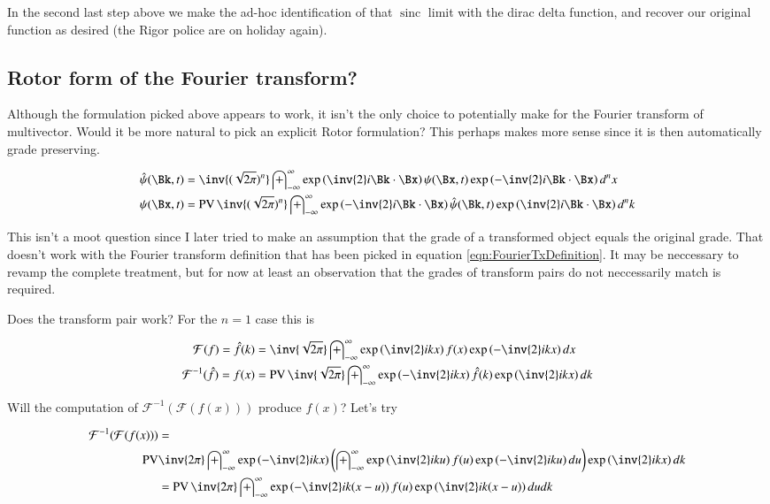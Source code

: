 \documentclass{article}
\DeclareMathOperator{\sinc}{sinc}
\DeclareMathOperator{\PV}{PV}
\newcommand{\FF}[0]{\mathcal{F}}
\newcommand{\IIinf}[0]{ \int_{-\infty}^\infty }
\begin{document}
In the second last step above we make the ad-hoc identification of that $\sinc$ limit with the dirac delta function, and recover
our original function as desired (the Rigor police are on holiday again).

\subsection{ Rotor form of the Fourier transform? }

Although the formulation picked above appears to work, it isn't the only choice to potentially make for the Fourier transform
of multivector.  Would it be more natural to pick an explicit Rotor formulation?  This perhaps makes more sense since it is then
automatically grade preserving.

\begin{align}\label{eqn:rotorFourier}
\hat{\psi}(\Bk, t) &= \inv{(\sqrt{2\pi})^n} \IIinf \exp\left( \inv{2} i \Bk \cdot \Bx \right) \psi(\Bx, t) \exp\left( - \inv{2} i \Bk \cdot \Bx \right) d^n x \\
{\psi}(\Bx, t) &= \PV \inv{(\sqrt{2\pi})^n} \IIinf \exp\left( -\inv{2} i \Bk \cdot \Bx \right) \hat{\psi}(\Bk, t) \exp\left( \inv{2} i \Bk \cdot \Bx \right) d^n k
\end{align}

This isn't a moot question since I later
tried to make an assumption that the grade of a transformed object equals the original grade.  That doesn't work with the
Fourier transform definition that has been picked in equation \ref{eqn:FourierTxDefinition}.  It may be neccessary to revamp the complete treatment, but
for now at least an observation that the grades of transform pairs do not neccessarily match is required.

Does the transform pair work?  For the $n=1$ case this is

\begin{align*}
\FF(f) = \hat{f}(k) &= \inv{\sqrt{2\pi}} \IIinf \exp\left( \inv{2} i k x \right) f(x) \exp\left( - \inv{2} i k x \right) dx \\
\FF^{-1}(\hat{f}) = {f}(x) &= \PV \inv{\sqrt{2\pi}} \IIinf \exp\left( -\inv{2} i k x \right) \hat{f}(k) \exp\left( \inv{2} i k x \right) dk
\end{align*}

Will the computation of $\FF^{-1}(\FF(f(x)))$ produce $f(x)$?  Let's try

\begin{align*}
\FF^{-1}(\FF(f(x)))
&= \\
\PV &\inv{{2\pi}} \IIinf \exp\left( -\inv{2} i k x \right) 
\left(
\IIinf \exp\left( \inv{2} i k u \right) f(u) \exp\left( - \inv{2} i k u \right) du 
\right)
\exp\left( \inv{2} i k x \right) dk \\
&=
\PV \inv{{2\pi}} \IIinf \exp\left( -\inv{2} i k (x -u) \right) f(u) \exp\left( \inv{2} i k (x -u) \right) du dk \\
\end{align*}
\end{document}
